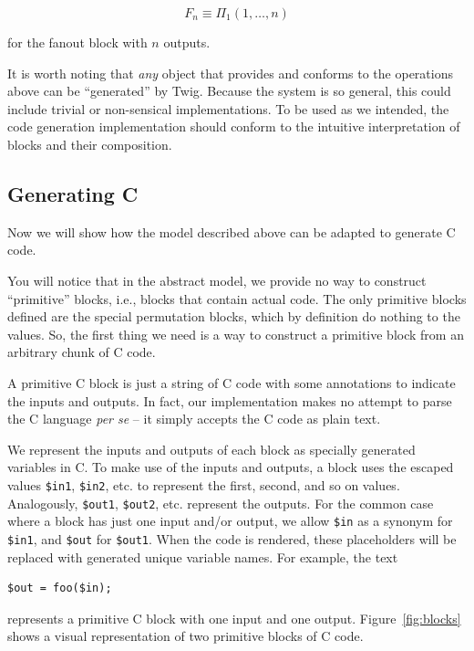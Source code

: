 \[
F_n \equiv \Pi_1(1,\ldots,n) 
\]

for the fanout block with $n$ outputs.

It is worth noting that \emph{any} object that provides and conforms to the operations above can be ``generated'' by Twig. Because the system is so general, this could include trivial or non-sensical implementations. To be used as we intended, the code generation implementation should conform to the intuitive interpretation of blocks and their composition.


\subsection{Generating C}
\label{sec:code-gen:c}

Now we will show how the model described above can be adapted to generate C code. 

You will notice that in the abstract model, we provide no way to construct ``primitive'' blocks, i.e., blocks that contain actual code. The only primitive blocks defined are the special permutation blocks, which by definition do nothing to the values. So, the first thing we need is a way to construct a primitive block from an arbitrary chunk of C code.

A primitive C block is just a string of C code with some annotations to indicate the inputs and outputs. In fact, our implementation makes no attempt to parse the C language \emph{per se} -- it simply accepts the C code as plain text.

We represent the inputs and outputs of each block as specially generated variables in C. To make use of the inputs and outputs, a block uses the escaped values \texttt{\$in1}, \texttt{\$in2}, etc. to represent the first, second, and so on values. Analogously, \texttt{\$out1}, \texttt{\$out2}, etc. represent the outputs. For the common case where a block has just one input and/or output, we allow \texttt{\$in} as a synonym for \texttt{\$in1}, and \texttt{\$out} for \texttt{\$out1}. When the code is rendered, these placeholders will be replaced with generated unique variable names. For example, the text 

\begin{verbatim}
$out = foo($in);
\end{verbatim}

represents a primitive C block with one input and one output. Figure~\ref{fig:blocks} shows a visual representation of two primitive blocks of C code.

